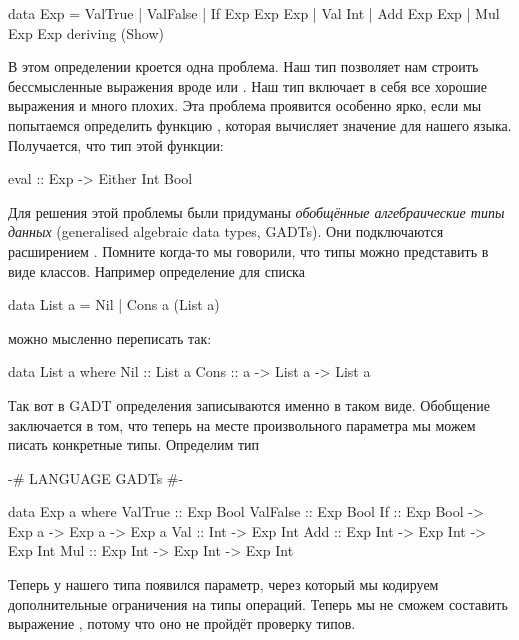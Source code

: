\begin{code}
data Exp = ValTrue
         | ValFalse
         | If Exp Exp Exp
         | Val Int
         | Add Exp Exp
         | Mul Exp Exp
         deriving (Show)
\end{code}

В этом определении кроется одна проблема. Наш тип
позволяет нам строить бессмысленные выражения
вроде  или .
Наш тип  включает в себя все хорошие выражения и
много плохих. Эта проблема проявится особенно ярко, если 
мы попытаемся определить функцию , которая 
вычисляет значение для нашего языка. Получается, что
тип этой функции:

\begin{code}
eval :: Exp -> Either Int Bool
\end{code}

Для решения этой проблемы были придуманы \emph{обобщённые алгебраические
типы данных} (generalised algebraic data types, GADTs). Они подключаются
расширением . Помните когда-то мы говорили, что типы
можно представить в виде классов. Например определение для списка 

\begin{code}
data List a = Nil | Cons a (List a)
\end{code}

\noindent можно мысленно переписать так:

\begin{code}
data List a where
    Nil  :: List a
    Cons :: a -> List a -> List a
\end{code}

Так вот в GADT определения записываются именно в таком виде.
Обобщение заключается в том, что теперь на месте произвольного
параметра  мы можем писать конкретные типы. Определим
тип 

\begin{code}
{-# LANGUAGE GADTs #-}

data Exp a where
    ValTrue     :: Exp Bool
    ValFalse    :: Exp Bool
    If          :: Exp Bool -> Exp a -> Exp a -> Exp a
    Val         :: Int -> Exp Int
    Add         :: Exp Int -> Exp Int -> Exp Int
    Mul         :: Exp Int -> Exp Int -> Exp Int
\end{code}

Теперь у нашего типа  появился параметр, через
который мы кодируем дополнительные ограничения на типы
операций. Теперь мы не сможем составить выражение
, потому что оно не пройдёт
проверку типов.

